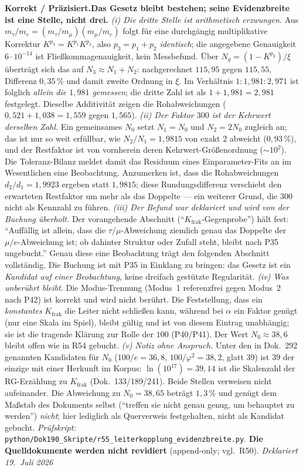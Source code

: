 \smallskip\noindent\textbf{Korrekt / Präzisiert.}\quad \textbf{Das Gesetz bleibt bestehen; seine Evidenzbreite ist eine Stelle, nicht drei.} \emph{(i) Die dritte Stelle ist arithmetisch erzwungen.} Aus $m_\tau/m_e=(m_\tau/m_\mu)(m_\mu/m_e)$ folgt für eine durchgängig multiplikative Korrektur $K^{p_3}=K^{p_1}K^{p_2}$, also $p_3=p_1+p_2$ \emph{identisch}; die angegebene Genauigkeit $6\cdot10^{-14}$ ist Fließkommagenauigkeit, kein Messbefund. Über $N_g=(1-K^{p_g})/\xi$ überträgt sich das auf $N_3\approx N_1+N_2$: nachgerechnet $115{,}95$ gegen $115{,}55$, Differenz $0{,}35\,\%$ und damit zweite Ordnung in $\xi$. Im Verhältnis $1{:}1{,}981{:}2{,}971$ ist folglich \emph{allein die $1{,}981$ gemessen}; die dritte Zahl ist als $1+1{,}981=2{,}981$ festgelegt. Dieselbe Additivität zeigen die Rohabweichungen ($0{,}521+1{,}038=1{,}559$ gegen $1{,}565$). \emph{(ii) Der Faktor $300$ ist der Kehrwert derselben Zahl.} Ein gemeinsames $N_0$ setzt $N_1=N_0$ und $N_2=2N_0$ zugleich an; das ist nur so weit erfüllbar, wie $N_2/N_1=1{,}9815$ von exakt $2$ abweicht ($0{,}93\,\%$), und der Restfaktor ist von vornherein deren Kehrwert-Größenordnung ($\sim10^2$). Die Toleranz-Bilanz meldet damit das Residuum eines Einparameter-Fits an im Wesentlichen eine Beobachtung. Anzumerken ist, dass die Rohabweichungen $d_2/d_1=1{,}9923$ ergeben statt $1{,}9815$; diese Rundungsdifferenz verschiebt den erwarteten Restfaktor um mehr als das Doppelte --- ein weiterer Grund, die $300$ nicht als Kennzahl zu führen. \emph{(iii) Der Befund war deklariert und wird von der Buchung überholt.} Der vorangehende Abschnitt (\enquote{$K_{\text{frak}}$-Gegenprobe}) hält fest: \enquote{Auffällig ist allein, dass die $\tau/\mu$-Abweichung ziemlich genau das Doppelte der $\mu/e$-Abweichung ist; ob dahinter Struktur oder Zufall steht, bleibt nach P35 ungebucht.} Genau diese eine Beobachtung trägt den folgenden Abschnitt vollständig. Die Buchung ist mit P35 in Einklang zu bringen: das Gesetz ist ein \emph{Kandidat auf einer Beobachtung}, keine dreifach gestützte Regularität. \emph{(iv) Was unberührt bleibt.} Die Modus-Trennung (Modus~1 referenzfrei gegen Modus~2 nach P42) ist korrekt und wird nicht berührt. Die Feststellung, dass ein \emph{konstantes} $K_{\text{frak}}$ die Leiter nicht schließen kann, während bei $\alpha$ ein Faktor genügt (nur eine Skala im Spiel), bleibt gültig und ist von diesem Eintrag unabhängig; sie ist die tragende Klärung zur Rolle der $100$ (P40/P41). Der Wert $N_0\approx38{,}6$ bleibt offen wie in R54 gebucht. \emph{(v) Notiz ohne Anspruch.} Unter den in Dok.~292 genannten Kandidaten für $N_0$ ($100/e=36{,}8$, $100/\varphi^2=38{,}2$, glatt $39$) ist $39$ der einzige mit einer Herkunft im Korpus: $\ln(10^{17})=39{,}14$ ist die Skalenzahl der RG-Erzählung zu $K_{\text{frak}}$ (Dok.~133/189/241). Beide Stellen verweisen nicht aufeinander. Die Abweichung zu $N_0=38{,}65$ beträgt $1{,}3\,\%$ und genügt dem Maßstab des Dokuments selbst (\enquote{treffen sie nicht genau genug, um behauptet zu werden}) \emph{nicht}; hier lediglich als Querverweis festgehalten, nicht als Kandidat gebucht. \emph{Prüfskript:} \texttt{python/Dok190\_Skripte/r55\_leiterkopplung\_evidenzbreite.py}. \textbf{Die Quelldokumente werden nicht revidiert} (append-only; vgl.\ R50). \emph{Deklariert 19.~Juli 2026}



